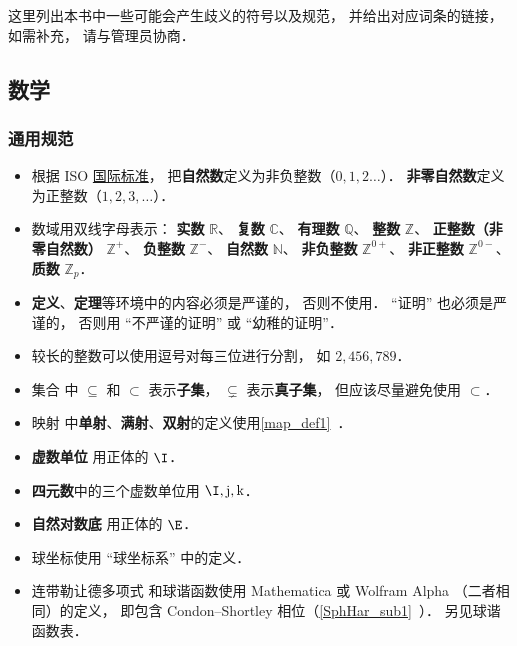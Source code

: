 
这里列出本书中一些可能会产生歧义的符号以及规范， 并给出对应词条的链接， 如需补充， 请与管理员协商．

\subsection{数学}
\subsubsection{通用规范}
\begin{itemize}
\item 根据 ISO \href{https://en.wikipedia.org/wiki/ISO/IEC_80000}{国际标准}， 把\textbf{自然数}定义为非负整数（$0,1,2\dots$）． \textbf{非零自然数}定义为正整数（$1,2,3,\dots$）．
\item 数域用双线字母表示： \textbf{实数} $\mathbb R$、 \textbf{复数} $\mathbb C$、 \textbf{有理数} $\mathbb Q$、 \textbf{整数} $\mathbb Z$、 \textbf{正整数（非零自然数）} $\mathbb Z^+$、 \textbf{负整数} $\mathbb Z^-$、 \textbf{自然数} $\mathbb N$、 \textbf{非负整数} $\mathbb Z^{0+}$、 \textbf{非正整数} $\mathbb Z^{0-}$、 \textbf{质数} $\mathbb Z_p$．
\item \textbf{定义}、\textbf{定理}等环境中的内容必须是严谨的， 否则不使用． “证明” 也必须是严谨的， 否则用 “不严谨的证明” 或 “幼稚的证明”．
\item 较长的整数可以使用逗号对每三位进行分割， 如 $2,456,789$．
\item 集合 中 $\subseteq$ 和 $\subset$ 表示\textbf{子集}， $\subsetneq$ 表示\textbf{真子集}， 但应该尽量避免使用 $\subset$．
\item 映射 中\textbf{单射}、\textbf{满射}、\textbf{双射}的定义使用\autoref{map_def1}~．
\item \textbf{虚数单位} 用正体的 $\I$．
\item \textbf{四元数}中的三个虚数单位用 $\I, \mathrm{j}, \mathrm{k}$．
\item \textbf{自然对数底} 用正体的 $\E$．
\item 球坐标使用 “球坐标系” 中的定义．
\item 连带勒让德多项式 和球谐函数使用 Mathematica 或 Wolfram Alpha （二者相同）的定义， 即包含 Condon–Shortley 相位（\autoref{SphHar_sub1}~）． 另见球谐函数表．
\end{itemize}

